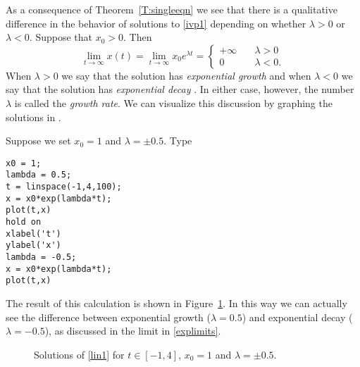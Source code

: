 \documentclass{ximera}
\begin{document}
As a consequence of Theorem~\ref{T:singleeqn} we see that there
is a qualitative difference in the behavior of solutions to
\eqref{ivp1} depending on whether $\lambda>0$ or $\lambda<0$.
Suppose that $x_0>0$.  Then
\begin{equation}  \label{explimits}
\lim_{t\to\infty} x(t) = \lim_{t\to\infty} x_0e^{\lambda t} =\left\{
\begin{array}{rl} +\infty & \quad\lambda>0 \\ 0 & \quad\lambda<0 . \end{array}
\right.
\end{equation}
When $\lambda>0$ we say that the solution has {\em exponential
growth\/} and when $\lambda< 0$ we say
that the solution has {\em exponential decay\/}
.  In either case, however, the
number $\lambda$ is called the {\em growth rate\/}.  We can visualize this discussion by graphing the
solutions in \Matlabp.

Suppose we set $x_0=1$ and $\lambda=\pm 0.5$.  Type
\begin{verbatim}
x0 = 1;
lambda = 0.5;
t = linspace(-1,4,100);
x = x0*exp(lambda*t);
plot(t,x)
hold on
xlabel('t')
ylabel('x')
lambda = -0.5;
x = x0*exp(lambda*t);
plot(t,x)
\end{verbatim}
The result of this calculation is shown in 
Figure~\ref{graph_labelfig}.  In this way we can actually see
the difference between exponential growth ($\lambda=0.5$) and
exponential decay ($\lambda=-0.5$), as discussed in the limit in 
\eqref{explimits}.

\begin{figure}[htb]
     \centerline{%
     }
     \caption{Solutions of \protect\eqref{lin1}
              for $t\in [-1,4]$, $x_0=1$ and $\lambda=\pm 0.5$.}
     \label{graph_labelfig}
\end{figure}
\end{document}
